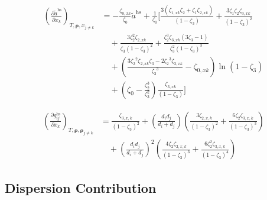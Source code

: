 \documentclass[12pt, letterpaper]{article}
\begin{document}
\begin{equation}
    \begin{aligned}
        \left(\frac{\partial\tilde{a}^{\mathrm{hs}}}{\partial x_{k}}\right)_{T,\boldsymbol{\rho},x_{j\neq k}}
        &=- \frac{\zeta_{0,xk}}{\zeta_{0}}\tilde{a}^{\mathrm{hs}}+\frac{1}{\zeta_{0}}\biggl[
        \frac{3(\zeta_{1,xk}\zeta_{2}+\zeta_{1}\zeta_{2,xk})}{(1-\zeta_{3})}
        +\frac{3\zeta_{1}\zeta_{2}\zeta_{3,xk}}{\left(1-\zeta_{3}\right)^{2}}
        \\
        &\quad +\frac{3\zeta_{2}^{2}\zeta_{2,xk}}{\zeta_{3}(1-\zeta_{3})^{2}}
        +\frac{\zeta_{2}^{3}\zeta_{3,xk}(3\zeta_{3}-1)}{\zeta_{3}^{2}(1-\zeta_{3})^{3}}
        \\
        &\quad +\left(
        \frac{3{\zeta_{2}}^{2}{\zeta_{2,xk}}{\zeta_{3}}-2{\zeta_{2}}^{3}{\zeta_{3,xk}}}{{\zeta_{3}}^{3}}
        -{\zeta_{0,xk}}
        \right)\ln(1-{\zeta_{3}})
        \\
        &\quad +\left(\zeta_{0}-\frac{\zeta_{2}^{3}}{\zeta_{3}^{2}}\right)\frac{\zeta_{3,xk}}{(1-\zeta_{3})}
        \biggr]
    \end{aligned}
    \label{eq:dares_hs_dxk}
\end{equation}


\begin{equation}
    \begin{aligned}
        \left(\frac{\partial g_{ij}^{\mathrm{hs}}}{\partial x_{k}}\right)_{T,\boldsymbol{\rho},\boldsymbol{\rho}_{j\neq k}}
        &=\frac{\zeta_{3,x,k}}{\left(1-\zeta_{3}\right)^{2}}
        +\left(\frac{d_{i}d_{j}}{d_{i}+d_{j}}\right)
        \left(\frac{3\zeta_{2,x,k}}{(1-\zeta_{3})^{2}}+\frac{6\zeta_{2}\zeta_{3,x,k}}{(1-\zeta_{3})^{3}}\right)
        \\
        &\quad +\left(\frac{d_{i}d_{j}}{d_{i}+d_{j}}\right)^{2}
        \left(\frac{4\zeta_{2}\zeta_{2,x,k}}{(1-\zeta_{3})^{3}}+\frac{6\zeta_{2}^{2}\zeta_{3,x,k}}{(1-\zeta_{3})^{4}}\right)
    \end{aligned}
    \label{eq:dg_hs_dxk}
\end{equation}

\subsection{Dispersion Contribution}
\end{document}
